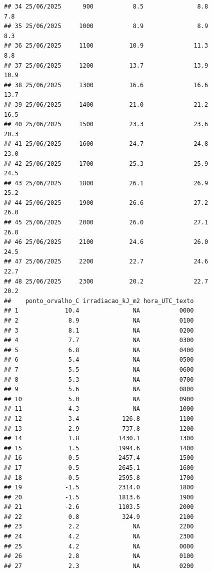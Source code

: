 \documentclass[
]{article}
\begin{document}
\begin{verbatim}
## 34 25/06/2025      900           8.5               8.8               7.8
## 35 25/06/2025     1000           8.9               8.9               8.3
## 36 25/06/2025     1100          10.9              11.3               8.8
## 37 25/06/2025     1200          13.7              13.9              10.9
## 38 25/06/2025     1300          16.6              16.6              13.7
## 39 25/06/2025     1400          21.0              21.2              16.5
## 40 25/06/2025     1500          23.3              23.6              20.3
## 41 25/06/2025     1600          24.7              24.8              23.0
## 42 25/06/2025     1700          25.3              25.9              24.5
## 43 25/06/2025     1800          26.1              26.9              25.2
## 44 25/06/2025     1900          26.6              27.2              26.0
## 45 25/06/2025     2000          26.0              27.1              26.0
## 46 25/06/2025     2100          24.6              26.0              24.5
## 47 25/06/2025     2200          22.7              24.6              22.7
## 48 25/06/2025     2300          20.2              22.7              20.2
##    ponto_orvalho_C irradiacao_kJ_m2 hora_UTC_texto
## 1             10.4               NA           0000
## 2              8.9               NA           0100
## 3              8.1               NA           0200
## 4              7.7               NA           0300
## 5              6.8               NA           0400
## 6              5.4               NA           0500
## 7              5.5               NA           0600
## 8              5.3               NA           0700
## 9              5.6               NA           0800
## 10             5.0               NA           0900
## 11             4.3               NA           1000
## 12             3.4            126.8           1100
## 13             2.9            737.8           1200
## 14             1.8           1430.1           1300
## 15             1.5           1994.6           1400
## 16             0.5           2457.4           1500
## 17            -0.5           2645.1           1600
## 18            -0.5           2595.8           1700
## 19            -1.5           2314.0           1800
## 20            -1.5           1813.6           1900
## 21            -2.6           1103.5           2000
## 22             0.8            324.9           2100
## 23             2.2               NA           2200
## 24             4.2               NA           2300
## 25             4.2               NA           0000
## 26             2.8               NA           0100
## 27             2.3               NA           0200

\end{verbatim}
\end{document}

